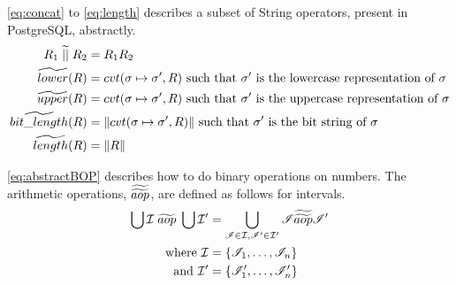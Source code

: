 \autoref{eq:concat} to \ref{eq:length} describes a subset of String operators, present in PostgreSQL, abstractly.
\begin{align}\label{eq:concat}
    R_1 \;\aab{||}\; R_2 &= R_1R_2 \\
    \aab{lower}(R) &= cvt(\sigma \mapsto \sigma', R) \text{ such that $\sigma'$ is the lowercase representation of $\sigma$}\\
    \aab{upper}(R) &= cvt(\sigma \mapsto \sigma', R) \text{ such that $\sigma'$ is the uppercase representation of $\sigma$}\\
    \aab{bit\_length}(R) &= \|cvt(\sigma \mapsto \sigma', R)\| \text{ such that $\sigma'$ is the bit string of $\sigma$} \\ \label{eq:length}
    \aab{length}(R) &= \|R\|
\end{align}

\autoref{eq:abstractBOP} describes how to do binary operations on numbers.
The arithmetic operations, $\widetilde{\widetilde{aop}}$, are defined as follows for intervals.
\begin{align}\label{eq:abstractBOP}
    \bigcup \mathcal{I} \;\aab{aop}\; \bigcup \mathcal{I}' &= \bigcup_{\mathscr{I}\in \mathcal{I}, \mathscr{I}'\in \mathcal{I}'}\mathscr{I}\aaab{aop}\mathscr{I}'\\
    \text{where } \mathcal{I}&=\{\mathscr{I}_1,\dots,\mathscr{I}_n\}\nonumber\\
    \text{and } \mathcal{I}'&=\{\mathscr{I}'_1,\dots,\mathscr{I}'_n\}\nonumber
\end{align}

